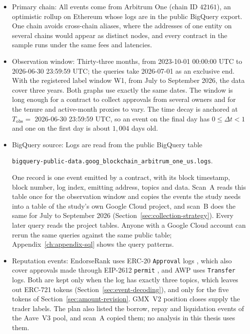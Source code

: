 \begin{itemize}
\item Primary chain: All events come from Arbitrum One (chain ID $42161$), an optimistic rollup on Ethereum \parencite{kalodner2018arbitrum} whose logs are in the public BigQuery export. One chain avoids cross-chain aliases, where the addresses of one entity on several chains would appear as distinct nodes, and every contract in the sample runs under the same fees and latencies.

\item Observation window: Thirty-three months, from 2023-10-01 00:00:00 UTC to 2026-06-30 23:59:59 UTC; the queries take 2026-07-01 as an exclusive end. With the registered label window W1, from July to September 2026, the data cover three years. Both graphs use exactly the same dates. The window is long enough for a contract to collect approvals from several owners and for the tenure and active-month proxies to vary. The time decay is anchored at $T_{\mathrm{obs}}=$ 2026-06-30 23:59:59 UTC, so an event on the final day has $0\le\Delta t<1$ and one on the first day is about $1{,}004$ days old.

\item BigQuery source: Logs are read from the public BigQuery table
\begin{center}
\texttt{bigquery-public-data.goog\_blockchain\_arbitrum\_one\_us.logs}.
\end{center}
One record is one event emitted by a contract, with its block timestamp, block number, log index, emitting address, topics and data. Scan~A reads this table once for the observation window and copies the events the study needs into a table of the study's own Google Cloud project, and scan~B does the same for July to September 2026 (Section~\ref{sec:collection-strategy}). Every later query reads the project tables. Anyone with a Google Cloud account can rerun the same queries against the same public table; Appendix~\ref{ch:appendix-sql} shows the query patterns.

\item Reputation events: EndorseRank uses ERC-20 \texttt{Approval} logs \parencite{vogelsteller2015erc20}, which also cover approvals made through EIP-2612 \texttt{permit} \parencite{lundfall2020permit}, and AWP uses \texttt{Transfer} logs. Both are kept only when the log has exactly three topics, which leaves out ERC-721 tokens (Section~\ref{sec:event-decoding}), and only for the five tokens of Section~\ref{sec:amount-revision}. GMX~V2 position closes supply the trader labels. The plan also listed the borrow, repay and liquidation events of the Aave~V3 pool, and scan~A copied them; no analysis in this thesis uses them.


\end{itemize}
